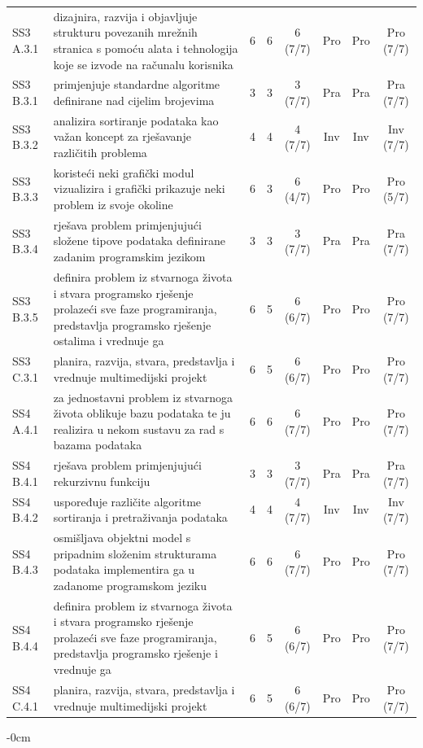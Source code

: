 \documentclass[journal,article,submit,pdftex,moreauthors]{Definitions/mdpi}
\begin{document}
{\begin{longtable}{p{1.35cm}p{6.6cm}cccccc}
SS3 A.3.1 & dizajnira, razvija i objavljuje strukturu povezanih mrežnih stranica s pomoću alata i tehnologija koje se izvode na računalu korisnika & 6 & 6 & 6 (7/7) & Pro & Pro & Pro (7/7) \\
SS3 B.3.1 & primjenjuje standardne algoritme definirane nad cijelim brojevima & 3 & 3 & 3 (7/7) & Pra & Pra & Pra (7/7) \\
SS3 B.3.2 & analizira sortiranje podataka kao važan koncept za rješavanje različitih problema & 4 & 4 & 4 (7/7) & Inv & Inv & Inv (7/7) \\
SS3 B.3.3 & koristeći neki grafički modul vizualizira i grafički prikazuje neki problem iz svoje okoline & 6 & 3 & 6 (4/7) & Pro & Pro & Pro (5/7) \\
SS3 B.3.4 & rješava problem primjenjujući složene tipove podataka definirane zadanim programskim jezikom & 3 & 3 & 3 (7/7) & Pra & Pra & Pra (7/7) \\
SS3 B.3.5 & definira problem iz stvarnoga života i stvara programsko rješenje prolazeći sve faze programiranja, predstavlja programsko rješenje ostalima i vrednuje ga & 6 & 5 & 6 (6/7) & Pro & Pro & Pro (7/7) \\
SS3 C.3.1 & planira, razvija, stvara, predstavlja i vrednuje multimedijski projekt & 6 & 5 & 6 (6/7) & Pro & Pro & Pro (7/7) \\
SS4 A.4.1 & za jednostavni problem iz stvarnoga života oblikuje bazu podataka te ju realizira u nekom sustavu za rad s bazama podataka & 6 & 6 & 6 (7/7) & Pro & Pro & Pro (7/7) \\
SS4 B.4.1 & rješava problem primjenjujući rekurzivnu funkciju & 3 & 3 & 3 (7/7) & Pra & Pra & Pra (7/7) \\
SS4 B.4.2 & uspoređuje različite algoritme sortiranja i pretraživanja podataka & 4 & 4 & 4 (7/7) & Inv & Inv & Inv (7/7) \\
SS4 B.4.3 & osmišljava objektni model s pripadnim složenim strukturama podataka implementira ga u zadanome programskom jeziku & 6 & 6 & 6 (7/7) & Pro & Pro & Pro (7/7) \\
SS4 B.4.4 & definira problem iz stvarnoga života i stvara programsko rješenje prolazeći sve faze programiranja, predstavlja programsko rješenje i vrednuje ga & 6 & 5 & 6 (6/7) & Pro & Pro & Pro (7/7) \\
SS4 C.4.1 & planira, razvija, stvara, predstavlja i vrednuje multimedijski projekt & 6 & 5 & 6 (6/7) & Pro & Pro & Pro (7/7) \\
\end{longtable}
}

\begin{adjustwidth}{-\extralength}{0cm}




\PublishersNote{}
\end{adjustwidth}
\end{document}
